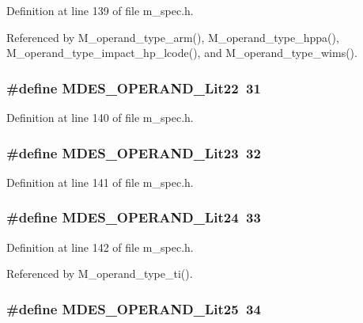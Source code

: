 Definition at line 139 of file m\_\-spec.h.

Referenced by M\_\-operand\_\-type\_\-arm(), M\_\-operand\_\-type\_\-hppa(), M\_\-operand\_\-type\_\-impact\_\-hp\_\-lcode(), and M\_\-operand\_\-type\_\-wims().
\subsubsection{\setlength{\rightskip}{0pt plus 5cm}\#define MDES\_\-OPERAND\_\-Lit22~31}\label{m__spec_8h_57198c7d61258c555601f542bc8482c6}




Definition at line 140 of file m\_\-spec.h.
\subsubsection{\setlength{\rightskip}{0pt plus 5cm}\#define MDES\_\-OPERAND\_\-Lit23~32}\label{m__spec_8h_cb75a0a80b5b7fba0d1ec538fd512802}




Definition at line 141 of file m\_\-spec.h.
\subsubsection{\setlength{\rightskip}{0pt plus 5cm}\#define MDES\_\-OPERAND\_\-Lit24~33}\label{m__spec_8h_7765b36dbd539b60fd44da6af67f34ad}




Definition at line 142 of file m\_\-spec.h.

Referenced by M\_\-operand\_\-type\_\-ti().
\subsubsection{\setlength{\rightskip}{0pt plus 5cm}\#define MDES\_\-OPERAND\_\-Lit25~34}\label{m__spec_8h_4c4408a732aeeea84c91b90396b3c27f}




